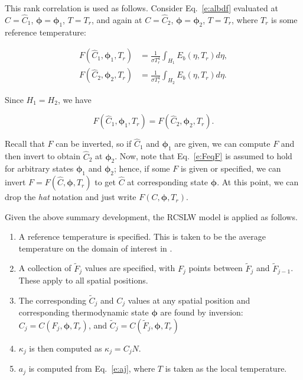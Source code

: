 \documentclass[preprint,12pt]{elsarticle}
\newcommand{\BS}{\boldsymbol}
\begin{document}
This rank correlation is used as follows. Consider Eq.~\ref{e:albdf} evaluated at $C=\hat{C}_1$, $\BS{\phi}=\BS{\phi}_1$, $T=T_r$, and again at
$C=\hat{C}_2$, $\BS{\phi}=\BS{\phi}_2$, $T=T_r$, where $T_r$ is some reference temperature:
%
\begin{linenomath}
    \begin{align} \label{e:albdf2}
        F(\hat{C}_1,\BS{\phi}_1,T_r) &= \frac{1}{\sigma T_r^4}\int_{H_1}E_b(\eta,T_r)d\eta, \\
        F(\hat{C}_2,\BS{\phi}_2,T_r) &= \frac{1}{\sigma T_r^4}\int_{H_2}E_b(\eta,T_r)d\eta.
    \end{align}
\end{linenomath}
%
Since $H_1=H_2$, we have 
%
\begin{linenomath}
    \begin{equation}\label{e:FeqF}
    F(\hat{C}_1,\BS{\phi}_1,T_r)=F(\hat{C}_2,\BS{\phi}_2,T_r).
\end{equation}
\end{linenomath}
%
Recall that $F$ can be inverted, so if $\hat{C}_1$ and $\BS{\phi}_1$ are given, we can compute $F$ and then invert to obtain $\hat{C}_2$ at $\BS{\phi}_2$. Now, note that Eq.~\ref{e:FeqF} is assumed to hold for arbitrary states $\BS{\phi}_1$ and $\BS{\phi}_2$; hence, if some $F$ is given or specified, we can invert $F=F(\hat{C},\BS{\phi},T_r)$ to get $\hat{C}$ at corresponding state $\BS{\phi}$. At this point, we can drop the \emph{hat} notation and just write $F(C,\BS{\phi},T_r)$.

Given the above summary development, the RCSLW model is applied as follows. 
%
\begin{enumerate}
    \item A reference temperature is specified. This is taken to be the average temperature on the domain of interest in \cite{Solovjov_2001}.
    \item A collection of $\tilde{F}_j$ values are specified, with $F_j$ points between $\tilde{F}_j$ and $\tilde{F}_{j-1}$. These apply to all spatial positions. 
    \item The corresponding $\tilde{C}_j$ and $C_j$ values at any spatial position and corresponding thermodynamic state $\BS{\phi}$ are found by inversion: $C_j = C(F_j,\BS{\phi},T_r)$, and $\tilde{C}_j = C(\tilde{F}_j,\BS{\phi},T_r)$
    \item $\kappa_j$ is then computed as $\kappa_j=C_jN$. 
    \item $a_j$ is computed from Eq.~\ref{e:aj}, where $T$ is taken as the local temperature.
\end{enumerate}
%
\end{document}
